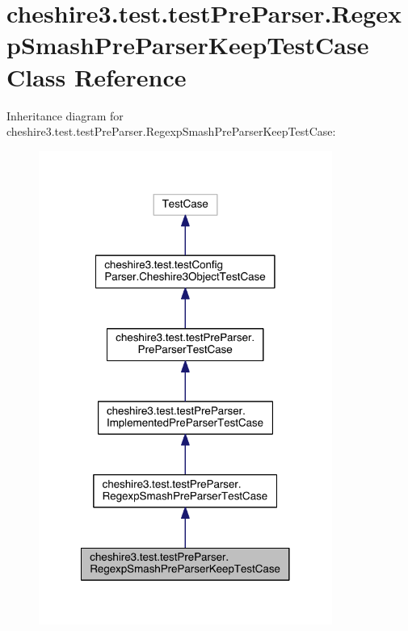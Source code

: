 \hypertarget{classcheshire3_1_1test_1_1test_pre_parser_1_1_regexp_smash_pre_parser_keep_test_case}{\section{cheshire3.\-test.\-test\-Pre\-Parser.\-Regexp\-Smash\-Pre\-Parser\-Keep\-Test\-Case Class Reference}
\label{classcheshire3_1_1test_1_1test_pre_parser_1_1_regexp_smash_pre_parser_keep_test_case}
}


Inheritance diagram for cheshire3.\-test.\-test\-Pre\-Parser.\-Regexp\-Smash\-Pre\-Parser\-Keep\-Test\-Case\-:
\nopagebreak
\begin{figure}[H]
\begin{center}
\leavevmode
\includegraphics[width=272pt]{classcheshire3_1_1test_1_1test_pre_parser_1_1_regexp_smash_pre_parser_keep_test_case__inherit__graph}
\end{center}
\end{figure}


